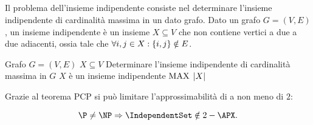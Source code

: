 \subsection{\IndependentSet}
Il problema dell'insieme indipendente consiste nel determinare l'insieme indipendente di cardinalità massima in un dato grafo.
Dato un grafo $G=(V,E)$, un insieme indipendente è un insieme $X\subseteq V$ che non contiene vertici a due a due adiacenti, ossia tale che $\forall i,j\in X:\left\{ i,j \right\}\notin E$.

\popt{\IndependentSet}
{Grafo $G=(V,E)$}
{$X\subseteq V$}
{Determinare l'insieme indipendente di cardinalità massima in $G$}
{$X$ è un insieme indipendente}
{$\mathrm{MAX}$}
{$| X |$}

Grazie al teorema PCP si può limitare l'approssimabilità di \IndependentSet a non meno di $2$:
\begin{theorem}\label{thm:ind_set_inapprox}
	\begin{equation*}
		\P\neq\NP \impl \IndependentSet\notin 2-\APX \text.
	\end{equation*}
\end{theorem}
